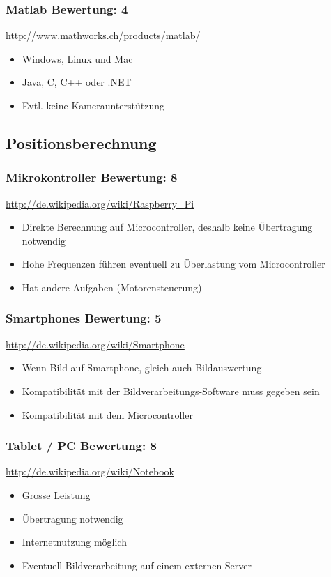 \subsubsection{Matlab  \hfill Bewertung: 4}
\url{http://www.mathworks.ch/products/matlab/}
\begin{itemize}
    \item Windows, Linux und Mac
    \item Java, C, C++ oder .NET
    \item Evtl. keine Kameraunterstützung
\end{itemize}

\subsection{Positionsberechnung}

\subsubsection{Mikrokontroller  \hfill Bewertung: 8}
\url{http://de.wikipedia.org/wiki/Raspberry_Pi}
\begin{itemize}
    \item Direkte Berechnung auf Microcontroller, deshalb keine Übertragung notwendig
    \item Hohe Frequenzen führen eventuell zu Überlastung vom Microcontroller
    \item Hat andere Aufgaben (Motorensteuerung)
\end{itemize}

\subsubsection{Smartphones  \hfill Bewertung: 5}
\url{http://de.wikipedia.org/wiki/Smartphone}
\begin{itemize}
    \item Wenn Bild auf Smartphone, gleich auch Bildauswertung
    \item Kompatibilität mit der Bildverarbeitungs-Software muss gegeben sein
    \item Kompatibilität mit dem Microcontroller
\end{itemize}

\subsubsection{Tablet / PC  \hfill Bewertung: 8}
\url{http://de.wikipedia.org/wiki/Notebook}
\begin{itemize}
    \item Grosse Leistung
    \item Übertragung notwendig
    \item Internetnutzung möglich
    \item Eventuell Bildverarbeitung auf einem externen Server
\end{itemize}

